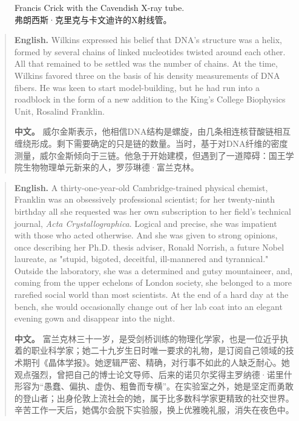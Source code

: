 \begin{figure}[htbp]
\centering
{}
\caption{Francis Crick with the Cavendish X-ray tube.\\弗朗西斯·克里克与卡文迪许的X射线管。}
\end{figure}

\begin{quote}
\noindent\textbf{English.} Wilkins expressed his belief that DNA's structure was a helix, formed by several chains of linked nucleotides twisted around each other. All that remained to be settled was the number of chains. At the time, Wilkins favored three on the basis of his density measurements of DNA fibers. He was keen to start model-building, but he had run into a roadblock in the form of a new addition to the King's College Biophysics Unit, Rosalind Franklin.

\smallskip
\noindent\textbf{中文。} 威尔金斯表示，他相信DNA结构是螺旋，由几条相连核苷酸链相互缠绕形成。剩下需要确定的只是链的数量。当时，基于对DNA纤维的密度测量，威尔金斯倾向于三链。他急于开始建模，但遇到了一道障碍：国王学院生物物理单元新来的人，罗莎琳德·富兰克林。
\end{quote}

\begin{quote}
\noindent\textbf{English.} A thirty-one-year-old Cambridge-trained physical chemist, Franklin was an obsessively professional scientist; for her twenty-ninth birthday all she requested was her own subscription to her field's technical journal, \emph{Acta Crystallographica}. Logical and precise, she was impatient with those who acted otherwise. And she was given to strong opinions, once describing her Ph.D. thesis adviser, Ronald Norrish, a future Nobel laureate, as "stupid, bigoted, deceitful, ill-mannered and tyrannical." Outside the laboratory, she was a determined and gutsy mountaineer, and, coming from the upper echelons of London society, she belonged to a more rarefied social world than most scientists. At the end of a hard day at the bench, she would occasionally change out of her lab coat into an elegant evening gown and disappear into the night.

\smallskip
\noindent\textbf{中文。} 富兰克林三十一岁，是受剑桥训练的物理化学家，也是一位近乎执着的职业科学家；她二十九岁生日时唯一要求的礼物，是订阅自己领域的技术期刊《晶体学报》。她逻辑严密、精确，对行事不如此的人缺乏耐心。她观点强烈，曾把自己的博士论文导师、后来的诺贝尔奖得主罗纳德·诺里什形容为“愚蠢、偏执、虚伪、粗鲁而专横”。在实验室之外，她是坚定而勇敢的登山者；出身伦敦上流社会的她，属于比多数科学家更精致的社交世界。辛苦工作一天后，她偶尔会脱下实验服，换上优雅晚礼服，消失在夜色中。
\end{quote}

